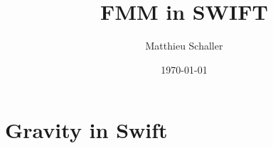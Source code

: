 \documentclass[fleqn, usenatbib, useAMS, a4paper]{mnras}
\title{FMM in SWIFT}
\author{Matthieu Schaller}
\newcommand{\swift}{{\sc Swift}\xspace}
\begin{document}
\date{\today}

\pagerange{\pageref{firstpage}--\pageref{lastpage}} 

\maketitle

\label{firstpage}

\begin{abstract}
\end{abstract}

\begin{keywords}
\end{keywords}

\section{Gravity in \swift}
\label{sec:gravity}



%






\appendix

\onecolumn



\label{lastpage}
\end{document}
